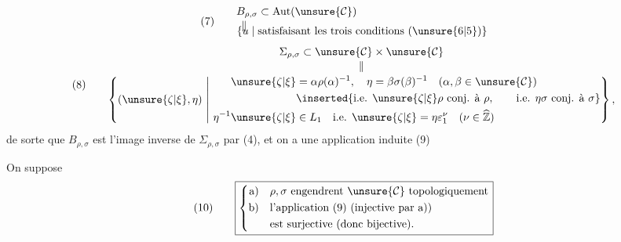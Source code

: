  
\[
(7)\qquad
\begin{aligned}
B_{\rho,\sigma}&\subset\mathrm{Aut}(\unsure{\mathcal{C}})\\[-2pt]
\Vert\quad&\\[-10pt]
\{u\mid{}&\text{satisfaisant les trois conditions }(\unsure{6|5})\}
\end{aligned}
\]
\[
(8)\qquad
\begin{gathered}
\Sigma_{\rho,\sigma}\subset\unsure{\mathcal{C}}\times\unsure{\mathcal{C}}\\[-2pt]
\Vert\\[-2pt]
\left\{(\unsure{\zeta|\xi},\eta)\ \middle|\ 
\begin{aligned}
\unsure{\zeta|\xi}&=\alpha\rho(\alpha)^{-1},\quad
\eta=\beta\sigma(\beta)^{-1}\quad(\alpha,\beta\in\unsure{\mathcal{C}})\\
&\inserted{\text{i.e. }\unsure{\zeta|\xi}\rho\text{ conj. à }\rho,\qquad\text{i.e. }\eta\sigma\text{ conj. à }\sigma}\\
\eta^{-1}\unsure{\zeta|\xi}&\in L_1\quad\text{i.e. }\unsure{\zeta|\xi}=\eta\varepsilon_1^\nu\quad(\nu\in\widehat{\mathbb Z})
\end{aligned}\right\},
\end{gathered}
\]
de sorte que $B_{\rho,\sigma}$ est l'image inverse de $\Sigma_{\rho,\sigma}$ par (4), et on a une application induite
\diagram{\begin{tikzcd}
B_{\rho,\sigma}\arrow[r,"\varphi=\varphi_{\rho,\sigma}"]&\Sigma_{\rho,\sigma}.
\end{tikzcd}}\hfill(9)

On suppose
\[
(10)\qquad\boxed{\left\{\begin{aligned}
\text{a)}\quad&\rho,\sigma\text{ engendrent }\unsure{\mathcal{C}}\text{ topologiquement}\\
\text{b)}\quad&\text{l'application (9) (injective par a))}\\
&\text{est surjective (donc bijective).}
\end{aligned}\right.}
\]

